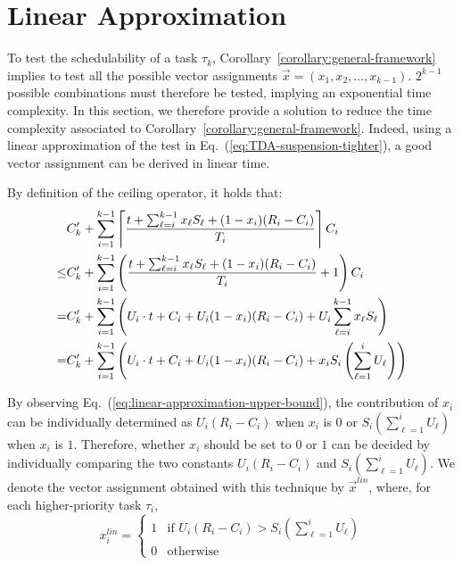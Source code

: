 \section{Linear Approximation}
\label{sec:linear-approximation}

To test the schedulability of a task $\tau_k$,
Corollary~\ref{corollary:general-framework} implies to test all the
possible vector assignments $\vec{x} = (x_1, x_2, \ldots, x_{k-1})$. $2^{k-1}$ possible combinations must therefore be tested, implying an exponential time complexity. In this section, we therefore provide a solution to reduce the time complexity associated to
Corollary~\ref{corollary:general-framework}. Indeed, using a linear approximation of the test in Eq.~(\ref{eq:TDA-suspension-tighter}), a good vector assignment can be derived in linear time. 

By definition of the ceiling operator, it holds that:
{\small \begin{align}
&C_k'+ \sum_{i=1}^{k-1}\ceiling{\frac{t+\sum_{\ell=i}^{k-1}x_\ell S_\ell+(1-x_i)(R_i-C_i)}{T_i}} C_i \nonumber\\
\leq& C_k' +   \sum_{i=1}^{k-1} \left(\frac{t+\sum_{\ell=i}^{k-1}x_\ell S_\ell +(1-x_i)(R_i-C_i)}{T_i} +1\right) C_i \nonumber\\
=& C_k' + \sum_{i=1}^{k-1} \left(U_i\cdot t + C_i+U_i (1-x_i)(R_i-C_i) + U_i\sum_{\ell=i}^{k-1}x_\ell S_\ell \right)\nonumber\\
=& C_k' + \sum_{i=1}^{k-1}  \left(U_i\cdot t + C_i + U_i (1-x_i)(R_i-C_i) + x_i S_i\left(\sum_{\ell=1}^{i}U_\ell\right)\right)\label{eq:linear-approximation-upper-bound}
\end{align}}

By observing Eq.~(\ref{eq:linear-approximation-upper-bound}), the
contribution of $x_i$ can be individually determined as $U_i(R_i-C_i)$
when $x_i$ is $0$ or $S_i(\sum_{\ell=1}^{i}U_\ell)$ when $x_i$ is
$1$. Therefore, whether $x_i$ should be set to $0$ or $1$ can be 
decided by individually comparing the two constants
$U_i(R_i-C_i)$ and $S_i(\sum_{\ell=1}^{i}U_\ell)$. We denote the
vector assignment obtained with this technique by $\vec{x}^{\mathit{lin}}$, where, for
each higher-priority task $\tau_i$,
\begin{equation*}
x_i^{\mathit{lin}} =
\begin{cases}
1 & \text{if~} U_i(R_i-C_i) > S_i(\sum_{\ell=1}^{i}U_\ell) \\
0 & \text{otherwise}
\end{cases}
\end{equation*}

